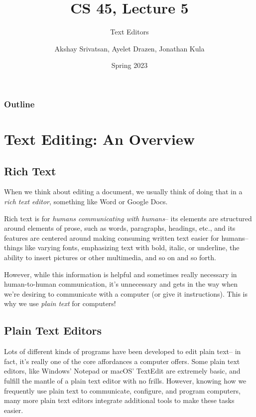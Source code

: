 \usepackage{shared/cs45}
\usepackage{epigraph}

\title{CS 45, Lecture 5}
\subtitle{Text Editors}
\date{Spring 2023}
\author{Akshay Srivatsan, Ayelet Drazen, Jonathan Kula}



\maketitle

\frame{\titlepage}

\begin{frame}
  \frametitle{Outline}
  \tableofcontents[hidesubsections]
\end{frame}

\section{Text Editing: An Overview}

\subsection{Rich Text}

When we think about editing a document, we usually think of doing that in 
a {\em rich text editor}, something like Word or Google Docs.

Rich text is for {\em humans communicating with humans}-- its elements
are structured around elements of prose, such as words, paragraphs,
headings, etc., and its features are centered around making consuming
written text easier for humans-- things like varying fonts, emphasizing
text with bold, italic, or underline, the ability to insert pictures
or other multimedia, and so on and so forth.

However, while this information is helpful and sometimes really necessary
in human-to-human communication, it's unnecessary and gets in the way when
we're desiring to communicate with a computer (or give it instructions).
This is why we use {\em plain text} for computers!

\subsection{Plain Text Editors}

Lots of different kinds of programs have been developed to edit plain text--
in fact, it's really one of the core affordances a computer offers. Some
plain text editors, like Windows' Notepad or macOS' TextEdit are extremely
basic, and fulfill the mantle of a plain text editor with no frills.
However, knowing how we frequently use plain text to communicate, configure,
and program computers, many more plain text editors integrate additional
tools to make these tasks easier.

